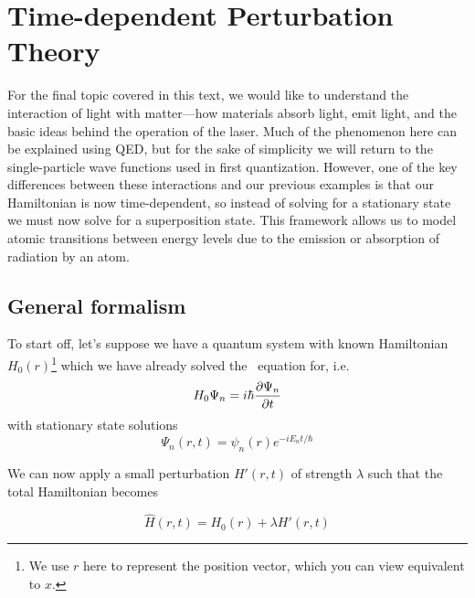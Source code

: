 %

%

\chapter[Perturbation Theory]{Time-dependent Perturbation Theory} \label{ch:pert}
For the final topic covered in this text, we would like to understand the interaction of light with matter---how materials absorb light, emit light, and the basic ideas behind the operation of the laser. Much of the phenomenon here can be explained using QED, but for the sake of simplicity we will return to the single-particle wave functions used in first quantization. However, one of the key differences between these interactions and our previous examples is that our Hamiltonian is now time-dependent, so instead of solving for a stationary state we must now solve for a superposition state. This framework allows us to model atomic transitions between energy levels due to the emission or absorption of radiation by an atom.

\section{General formalism}
To start off, let's suppose we have a quantum system with known Hamiltonian $H_0(r)$\footnote{We use $r$ here to represent the position vector, which you can view equivalent to $x$.} which we have already solved the \Sch\ equation for, i.e.
\begin{equation*}
	H_0\Psi_n = i\hbar \pdv{\Psi_n}{t}
\end{equation*}
with stationary state solutions
\begin{equation*}
	\Psi_n(r,t) = \psi_n(r)e^{-iE_nt/\hbar}
\end{equation*}

We can now apply a small perturbation $H'(r,t)$ of strength $\lambda$ such that the total Hamiltonian becomes 
\begin{tcolorbox}[title = Hamiltonian for small perturbations] \vspace{-2ex}
	\begin{equation}
	\hat{H}(r,t) = H_0(r) + \lambda H'(r,t) \label{eq:ham-pert}
	\end{equation}	
\end{tcolorbox}
	
